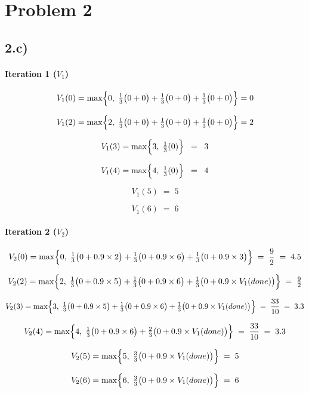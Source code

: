 \documentclass[11pt]{article}
\begin{document}
\section*{Problem 2}
\subsection*{2.c)}

\paragraph{Iteration 1 (\(V_1\))}
\[
V_1(0)
= \max\Bigl\{
0,\;
\tfrac{1}{3}\bigl(0 + 0\bigr)
+ \tfrac{1}{3}\bigl(0 + 0\bigr)
+ \tfrac{1}{3}\bigl(0 + 0\bigr)
\Bigr\}
= 0
\]

\[
V_1(2)
= \max\Bigl\{
2,\;
\tfrac{1}{3}\bigl(0 + 0\bigr)
+ \tfrac{1}{3}\bigl(0 + 0\bigr)
+ \tfrac{1}{3}\bigl(0 + 0\bigr)
\Bigr\}
= 2
\]

\[
V_1(3)
= \max\Bigl\{
3,\;
\tfrac{1}{3}(0)
\Bigr\}
\;\;=\;\;3
\]

\[
V_1(4)
= \max\Bigl\{
4,\;
\tfrac{1}{3}(0)
\Bigr\}
\;\;=\;\;4
\]

\[
V_1(5) \;=\; 5
\]

\[
V_1(6) \;=\; 6
\]

\paragraph{Iteration 2 (\(V_2\))}

\[
V_2(0)
= \max\Bigl\{
0,\;
\tfrac{1}{3}\bigl(0 + 0.9 \times 2\bigr)
+ \tfrac{1}{3}\bigl(0 + 0.9 \times 6\bigr)
+ \tfrac{1}{3}\bigl(0 + 0.9 \times 3\bigr)
\Bigr\}
\;=\;
\frac{9}{2}
\;=\;
4.5
\]

\[
V_2(2)
= \max\Bigl\{
2,\;
\tfrac{1}{3}\bigl(0 + 0.9 \times 5\bigr)
+ \tfrac{1}{3}\bigl(0 + 0.9 \times 6\bigr)
+ \tfrac{1}{3}\bigl(0 + 0.9 \times V_1(done)\bigr)
\Bigr\}
\;=\;\tfrac{9}{2}
\]

\[
V_2(3)
= \max\Bigl\{
3,\;
\tfrac{1}{3}\bigl(0 + 0.9 \times 5\bigr)
+ \tfrac{1}{3}\bigl(0 + 0.9 \times 6\bigr)
+ \tfrac{1}{3}\bigl(0 + 0.9 \times V_1(done)\bigr)
\Bigr\}
\;=\;
\frac{33}{10}
\;=\;
3.3
\]

\[
V_2(4)
= \max\Bigl\{
4,\;
\tfrac{1}{3}\bigl(0 + 0.9 \times 6\bigr)
+ \tfrac{2}{3}\bigl(0 + 0.9 \times V_1(done)\bigr)
\Bigr\}
\;=\;
\frac{33}{10}
\;=\;
3.3
\]

\[
V_2(5)
= \max\Bigl\{
5,\;
\tfrac{3}{3}\bigl(0 + 0.9 \times V_1(done)\bigr)
\Bigr\}
\;=\;
5
\]

\[
V_2(6)
= \max\Bigl\{
6,\;
\tfrac{3}{3}\bigl(0 + 0.9 \times V_1(done)\bigr)
\Bigr\}
\;=\;
6
\]
\end{document}
